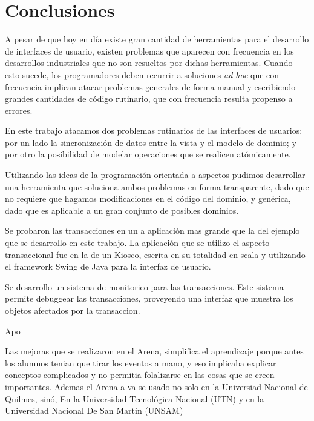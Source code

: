 \section{Conclusiones}
\label{conclusions}
A pesar de que hoy en día existe gran cantidad de herramientas para el
desarrollo de interfaces de usuario, existen problemas que
aparecen con frecuencia en los desarrollos industriales que no son resueltos por
dichas herramientas.
 Cuando esto sucede, los programadores deben recurrir a soluciones \emph{ad-hoc}
que con frecuencia implican atacar problemas generales de forma manual y
escribiendo grandes cantidades de código rutinario, que con frecuencia resulta
propenso a errores.

En este trabajo atacamos dos problemas rutinarios de las interfaces de usuarios:
por un lado la sincronización de datos entre la vista y el modelo de dominio; y
por otro la posibilidad de modelar operaciones que se realicen atómicamente.

Utilizando las ideas de la programación orientada a aspectos pudimos desarrollar
una herramienta que soluciona ambos problemas en forma transparente, dado que no
requiere que hagamos modificaciones en el código del dominio, y genérica, dado
que es aplicable a un gran conjunto de posibles dominios.


Se probaron las transacciones en un a aplicación mas grande que la del ejemplo
que se desarrollo en este trabajo. La aplicación que se utilizo el aspecto
transaccional fue en la de un Kiosco, escrita en su totalidad en scala  y
utilizando el framework Swing de Java para la interfaz de usuario.

Se desarrollo un sistema de monitorieo para las transacciones. Este sistema
permite debuggear las transacciones, proveyendo una interfaz que muestra los
objetos afectados por la transaccion.

Apo

Las mejoras que se realizaron en el Arena, simplifica el aprendizaje porque
antes los alumnos tenian que tirar los eventos a mano, y eso implicaba explicar
conceptos complicados y no permitia folalizarse en las cosas que se creen importantes.
Ademas el Arena a va se usado no solo en la Universiad Nacional de Quilmes,
sinó, En la Universidad Tecnológica Nacional (UTN) y en la Universidad Nacional
De San Martin (UNSAM)
